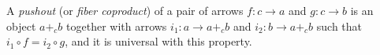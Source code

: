 A \emph{pushout} (or \emph{fiber coproduct}) of a pair of arrows $f: c \to a$ and $g: c \to b$ is an object $a +_c b$ together with arrows $i_1: a \to a +_c b$ and $i_2: b \to a +_c b$ such that $i_1 \circ f = i_2 \circ g$, and it is universal with this property.
